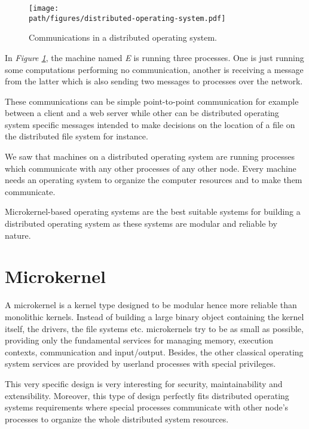 \begin{figure}[h]
  \begin{center}
    \texttt{[image: \\path/figures/distributed-operating-system.pdf]}
    \caption{Communications in a distributed operating system.}
    \label{figure:distributed-operating-system}
  \end{center}
\end{figure}

In \textit{Figure \ref{figure:distributed-operating-system}}, the machine
named \textit{E} is running three processes. One is just running some
computations performing no communication, another is receiving a message
from the latter which is also sending two messages to processes over the
network.

These communications can be simple point-to-point communication for example
between a client and a web server while other can be distributed operating
system specific messages intended to make decisions on the location of a file
on the distributed file system for instance.

We saw that machines on a distributed operating system are running processes
which communicate with any other processes of any other node. Every machine
needs an operating system to organize the computer resources and to make
them communicate.

Microkernel-based operating systems are the best suitable systems
for building a distributed operating system as these systems are modular
and reliable by nature.

%
%

\section{Microkernel}

A microkernel is a kernel type designed to be modular hence more reliable than
monolithic kernels. Instead of building a large binary object containing the
kernel itself, the drivers, the file systems etc. microkernels try to be as
small as possible, providing only the fundamental services for managing
memory, execution contexts, communication and input/output. Besides, the other
classical operating system services are provided by userland processes with
special privileges.

This very specific design is very interesting for security, maintainability
and extensibility. Moreover, this type of design perfectly fits
distributed operating systems requirements where special processes
communicate with other node's processes to organize the whole distributed
system resources.

